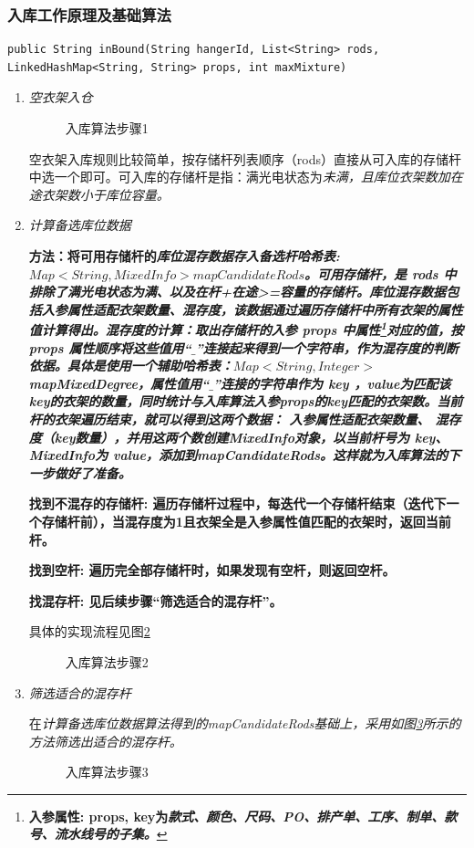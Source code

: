 \subsubsection{入库工作原理及基础算法}
\begin{verbatim}
public String inBound(String hangerId, List<String> rods, LinkedHashMap<String, String> props, int maxMixture)
\end{verbatim}
\begin{enumerate}[leftmargin=32pt,label=\bf{步骤\Roman*.}]
	\item \it{空衣架入仓}
	\begin{figure}[!h]
		\centering
		\resizebox{0.6\linewidth}{!}{}
		\caption{入库算法步骤1}\label{fig:inbound1}
	\end{figure}
	\par
	空衣架入库规则比较简单，按存储杆列表顺序（rods）直接从可入库的存储杆中选一个即可。可入库的存储杆是指：满光电状态为\it{未满}，且库位衣架数加在途衣架数小于库位容量。
	\item \it{计算备选库位数据}\par
	\bf{方法}：将可用存储杆的\it{库位混存数据}存入备选杆哈希表: $Map<String, MixedInfo> mapCandidateRods$。\bf{可用存储杆}，是 rods 中排除了满光电状态为\it{满}、以及\it{在杆+在途>=容量}的存储杆。\bf{库位混存数据}包括\it{入参属性适配衣架数量}、\it{混存度}，该数据通过遍历存储杆中所有衣架的属性值计算得出。混存度的计算：取出存储杆的入参 props 中属性\footnote{\bf{入参属性}: props, key为\it{款式、颜色、尺码、PO、排产单、工序、制单、款号、流水线号}的子集。}对应的值，按 props 属性顺序将这些值用“$\_$”连接起来得到一个字符串，作为混存度的判断依据。具体是使用一个辅助哈希表：$Map<String, Integer>$ mapMixedDegree，属性值用“$\_$”连接的字符串作为 key ，value为匹配该key的衣架的数量，同时统计与入库算法入参props的key匹配的衣架数。当前杆的衣架遍历结束，就可以得到这两个数据： 入参属性适配衣架数量、 混存度（key数量），并用这两个数创建\it{MixedInfo}对象，以当前杆号为 key、MixedInfo为 value，添加到mapCandidateRods。这样就为入库算法的下一步做好了准备。\par
	\bf{找到不混存的存储杆}: 遍历存储杆过程中，每迭代一个存储杆结束（迭代下一个存储杆前），当混存度为1且衣架全是入参属性值匹配的衣架时，返回当前杆。\par
	\bf{找到空杆}: 遍历完全部存储杆时，如果发现有空杆，则返回空杆。\par
	\bf{找混存杆}: 见后续步骤“筛选适合的混存杆”。\par
	具体的实现流程见图\ref{fig:inbound2}
	\begin{figure}[!h]
		\centering
		\resizebox{1.0\linewidth}{!}{}
		\caption{入库算法步骤2}\label{fig:inbound2}
	\end{figure}
	\item \it{筛选适合的混存杆}\par
	在\it{计算备选库位数据}算法得到的mapCandidateRods基础上，采用如图\ref{fig:inbound3}所示的方法筛选出适合的混存杆。
	\begin{figure}[!h]
		\centering
		\resizebox{0.8\linewidth}{!}{}
		\caption{入库算法步骤3}\label{fig:inbound3}
	\end{figure}


\end{enumerate}
